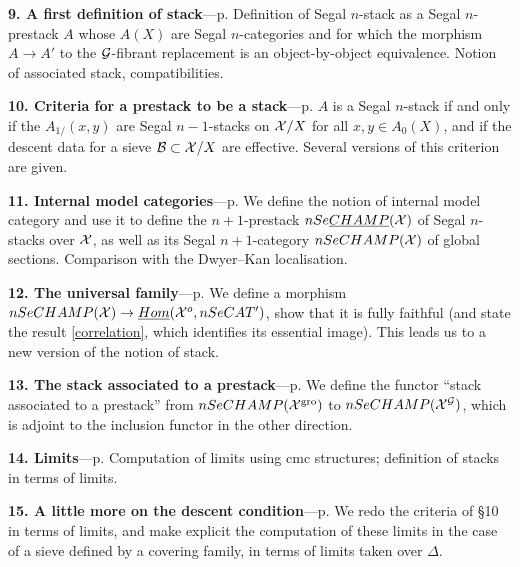 \noindent
{\bf 9. A first definition of stack}---p.
\pageref{notionchamppage}
\newline
{\small
Definition of Segal $n$-stack as a Segal $n$-prestack $A$ whose $A(X)$ are
Segal $n$-categories and for which the morphism $A\rightarrow A'$ to the
${\cal G}$-fibrant replacement is an object-by-object equivalence. Notion of
associated stack, compatibilities.}

\noindent
{\bf 10. Criteria for a prestack to be a stack}---p.
\pageref{caracterisationpage}
\newline
{\small
$A$ is a Segal $n$-stack if and only if the $A_{1/}(x,y)$ are Segal
$n-1$-stacks on ${\cal X} /X$ for all $x,y\in A_0(X)$, and if the descent data
for a sieve ${\cal B} \subset {\cal X} /X$ are effective. Several versions of this
criterion are given.}

\noindent
{\bf 11. Internal model categories}---p.
\pageref{cmipage}
\newline
{\small
We define the notion of internal model category and use it to define the
$n+1$-prestack $nSe\underline{CHAMP}({\cal X} )$ of Segal $n$-stacks over ${\cal X}$,
as well as its Segal $n+1$-category $nSeCHAMP({\cal X} )$ of global sections.
Comparison with the Dwyer--Kan localisation.}

\noindent
{\bf 12. The universal family}---p.
\pageref{universellepage}
\newline
{\small
We define a morphism $nSeCHAMP({\cal X} )\rightarrow \underline{Hom}({\cal X} ^o,
nSeCAT')$, show that it is fully faithful (and state the result
\ref{correlation}, which identifies its essential image). This leads us to
a new version of the notion of stack.}

\noindent
{\bf 13. The stack associated to a prestack}---p.
\pageref{associepage}
\newline
{\small
We define the functor ``stack associated to a prestack'' from
$nSeCHAMP({\cal X} ^{\rm gro})$ to $nSeCHAMP ({\cal X} ^{{\cal G}})$, which is adjoint to
the inclusion functor in the other direction.}

\noindent
{\bf 14. Limits}---p.
\pageref{limitespage}
\newline
{\small
Computation of limits using cmc structures; definition of stacks in terms
of limits.}

\noindent
{\bf 15. A little more on the descent condition}---p.
\pageref{peupluspage}
\newline
{\small
We redo the criteria of \S10 in terms of limits, and make explicit the
computation of these limits in the case of a sieve defined by a covering
family, in terms of limits taken over $\Delta$.}

